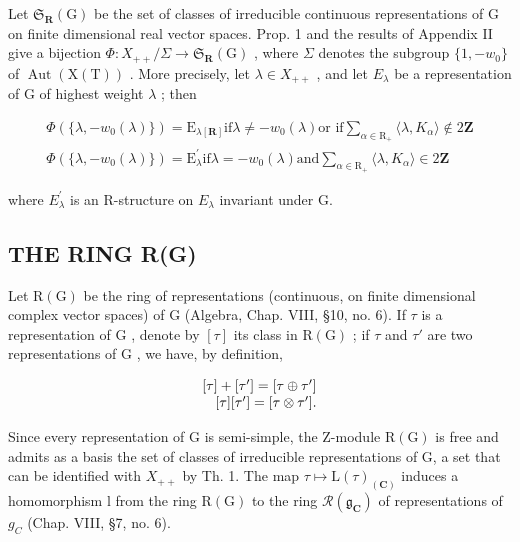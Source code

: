 Let \(\mathfrak{S}_{\mathbf{R}}(\mathrm{G})\) be the set of classes of irreducible continuous representations of G on finite dimensional real vector spaces. Prop. 1 and the results of Appendix II give a bijection \(\Phi:X_{++}/\Sigma\to\mathfrak{S}_{\mathbf{R}}(\mathrm{G})\) , where \(\Sigma\) denotes the subgroup \(\{1,-w_{0}\}\) of \(\operatorname{Aut}(\mathrm{X}(\mathrm{T}))\) . More precisely, let \(\lambda\in X_{++}\) , and let \(E_{\lambda}\) be a representation of G of highest weight \(\lambda\) ; then

\[
\begin{array}{c} \Phi (\{\lambda , - w _ {0} (\lambda) \}) = \mathrm{E} _ {\lambda [ \mathbf {R} ]} \text {if} \lambda \neq - w _ {0} (\lambda) \text {or if} \sum_ {\alpha \in \mathrm{R} _ {+}} \langle \lambda , K _ {\alpha} \rangle \notin 2 \mathbf {Z} \\ \Phi (\{\lambda , - w _ {0} (\lambda) \}) = \mathrm{E} _ {\lambda} ^ {\prime} \text {if} \lambda = - w _ {0} (\lambda) \text {and} \sum_ {\alpha \in \mathrm{R} _ {+}} \langle \lambda , K _ {\alpha} \rangle \in 2 \mathbf {Z} \end{array}
\]

where \(E_{\lambda}^{\prime}\) is an R-structure on \(E_{\lambda}\) invariant under G.

\subsection{THE RING R(G)}

Let \(\mathrm{R}(\mathrm{G})\) be the ring of representations (continuous, on finite dimensional complex vector spaces) of \(\mathrm{G}\) (Algebra, Chap. VIII, §10, no. 6). If \(\tau\) is a representation of \(\mathrm{G}\) , denote by \([\tau]\) its class in \(\mathrm{R}(\mathrm{G})\) ; if \(\tau\) and \(\tau'\) are two representations of \(\mathrm{G}\) , we have, by definition,

\[
\begin{array}{r} [ \tau ] + [ \tau^ {\prime} ] = [ \tau \oplus \tau^ {\prime} ] \\ \relax [ \tau ] [ \tau^ {\prime} ] = [ \tau \otimes \tau^ {\prime} ]. \end{array}
\]

Since every representation of G is semi-simple, the Z-module \(\mathrm{R}(\mathrm{G})\) is free and admits as a basis the set of classes of irreducible representations of G, a set that can be identified with \(X_{++}\) by Th. 1. The map \(\tau \mapsto \mathrm{L}(\tau)_{(\mathbf{C})}\) induces a homomorphism l from the ring \(\mathrm{R}(\mathrm{G})\) to the ring \(\mathcal{R}(\mathfrak{g}_{\mathbf{C}})\) of representations of \(g_{C}\) (Chap. VIII, §7, no. 6).

